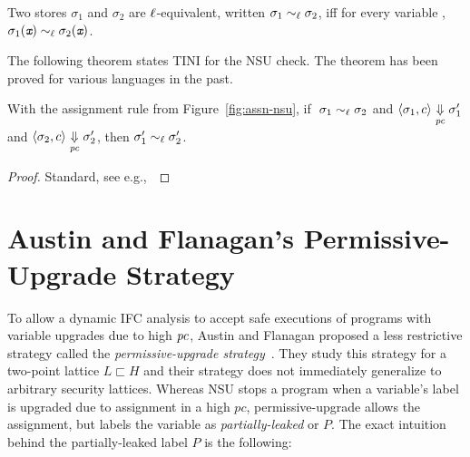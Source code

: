 \begin{mydef}
  Two stores $\sigma_1$ and $\sigma_2$ are $\ell$-equivalent,
  written $\sigma_1 \sim_\ell \sigma_2$, iff for every variable \emph{},
  $\sigma_1(\emph{\texttt{x}}) \sim_\ell \sigma_2(\emph{\texttt{x}})$.
\end{mydef}

The following theorem states TINI for the NSU check. The theorem has
been proved for various languages in the past.

\begin{myThm}
  With the assignment rule  from
  Figure~\ref{fig:assn-nsu}, if 
  $~\sigma_1 \sim_\ell \sigma_2$ and $\langle \sigma_1, c \rangle
  \underset{\mathit{pc}}{\Downarrow} \sigma_1' $ and $\langle \sigma_2, c
  \rangle \underset{\mathit{pc}}{\Downarrow} \sigma_2' $, then $\sigma_1' \sim_\ell
  \sigma_2'$.
\end{myThm}
\begin{proof} Standard, see e.g.,~\cite{plas09}
\end{proof}

  


\section{Austin and Flanagan's Permissive-Upgrade Strategy}
\label{sec:existing}

To allow a dynamic IFC analysis to accept safe executions of programs
with variable upgrades due to high $\mathit{pc}$, Austin and Flanagan proposed
a less restrictive strategy called the \emph{permissive-upgrade
  strategy}~\cite{plas10}. They study this strategy for a two-point
lattice $L \sqsubset H$ and their strategy does not immediately
generalize to arbitrary security lattices. Whereas NSU stops a program  
when a variable's label is upgraded due to assignment in a high $pc$,
permissive-upgrade allows the assignment, but labels the variable as 
\emph{partially-leaked} or $P$. The exact intuition behind the
partially-leaked label $P$ is the following: 

